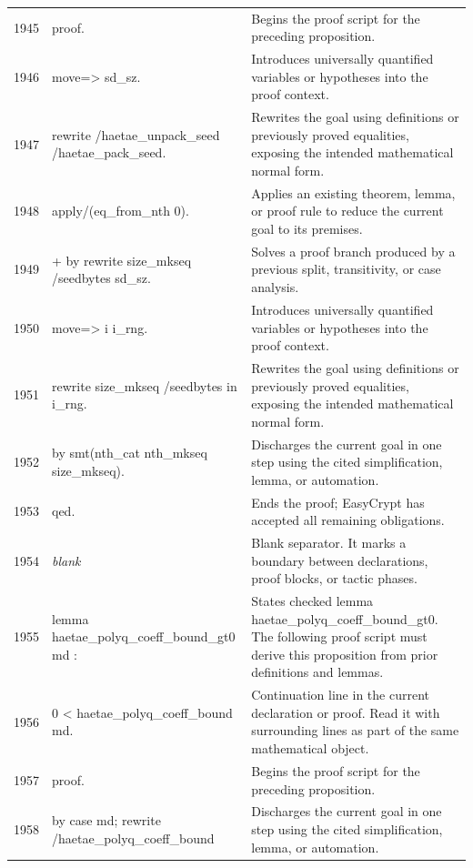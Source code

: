 \documentclass[10pt]{article}
\begin{document}
\begin{longtable}{r L{0.53\textwidth} L{0.37\textwidth}}
1945 & {\ttfamily\scriptsize proof.} & Begins the proof script for the preceding proposition. \\
1946 & {\ttfamily\scriptsize move=> sd\_sz.} & Introduces universally quantified variables or hypotheses into the proof context. \\
1947 & {\ttfamily\scriptsize rewrite /haetae\_unpack\_seed /haetae\_pack\_seed.} & Rewrites the goal using definitions or previously proved equalities, exposing the intended mathematical normal form. \\
1948 & {\ttfamily\scriptsize apply/(eq\_from\_nth 0).} & Applies an existing theorem, lemma, or proof rule to reduce the current goal to its premises. \\
1949 & {\ttfamily\scriptsize + by rewrite size\_mkseq /seedbytes sd\_sz.} & Solves a proof branch produced by a previous split, transitivity, or case analysis. \\
1950 & {\ttfamily\scriptsize move=> i i\_rng.} & Introduces universally quantified variables or hypotheses into the proof context. \\
1951 & {\ttfamily\scriptsize rewrite size\_mkseq /seedbytes in i\_rng.} & Rewrites the goal using definitions or previously proved equalities, exposing the intended mathematical normal form. \\
1952 & {\ttfamily\scriptsize by smt(nth\_cat nth\_mkseq size\_mkseq).} & Discharges the current goal in one step using the cited simplification, lemma, or automation. \\
1953 & {\ttfamily\scriptsize qed.} & Ends the proof; EasyCrypt has accepted all remaining obligations. \\
1954 & {\ttfamily\scriptsize \emph{blank}} & Blank separator.  It marks a boundary between declarations, proof blocks, or tactic phases. \\
1955 & {\ttfamily\scriptsize lemma haetae\_polyq\_coeff\_bound\_gt0 md :} & States checked lemma haetae\_polyq\_coeff\_bound\_gt0.  The following proof script must derive this proposition from prior definitions and lemmas. \\
1956 & {\ttfamily\scriptsize   0 < haetae\_polyq\_coeff\_bound md.} & Continuation line in the current declaration or proof.  Read it with surrounding lines as part of the same mathematical object. \\
1957 & {\ttfamily\scriptsize proof.} & Begins the proof script for the preceding proposition. \\
1958 & {\ttfamily\scriptsize by case md; rewrite /haetae\_polyq\_coeff\_bound} & Discharges the current goal in one step using the cited simplification, lemma, or automation. \\

\end{longtable}
\end{document}
